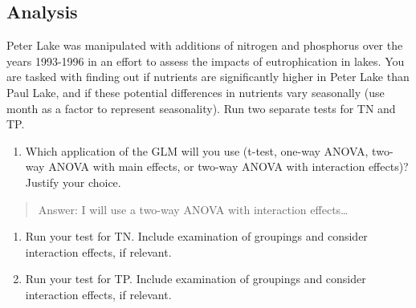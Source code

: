 \documentclass[]{article}
\newenvironment{Shaded}{\begin{snugshade}}{\end{snugshade}}
\newcommand{\CommentTok}[1]{\textcolor[rgb]{0.56,0.35,0.01}{\textit{#1}}}
\newcommand{\DataTypeTok}[1]{\textcolor[rgb]{0.13,0.29,0.53}{#1}}
\newcommand{\FloatTok}[1]{\textcolor[rgb]{0.00,0.00,0.81}{#1}}
\newcommand{\KeywordTok}[1]{\textcolor[rgb]{0.13,0.29,0.53}{\textbf{#1}}}
\newcommand{\NormalTok}[1]{#1}
\newcommand{\OperatorTok}[1]{\textcolor[rgb]{0.81,0.36,0.00}{\textbf{#1}}}
\newcommand{\StringTok}[1]{\textcolor[rgb]{0.31,0.60,0.02}{#1}}
\providecommand{\tightlist}{%
  \setlength{\itemsep}{0pt}\setlength{\parskip}{0pt}}
\begin{document}
\hypertarget{analysis}{%
\subsection{Analysis}\label{analysis}}

Peter Lake was manipulated with additions of nitrogen and phosphorus
over the years 1993-1996 in an effort to assess the impacts of
eutrophication in lakes. You are tasked with finding out if nutrients
are significantly higher in Peter Lake than Paul Lake, and if these
potential differences in nutrients vary seasonally (use month as a
factor to represent seasonality). Run two separate tests for TN and TP.

\begin{enumerate}
\def\labelenumi{\arabic{enumi}.}
\setcounter{enumi}{3}
\tightlist
\item
  Which application of the GLM will you use (t-test, one-way ANOVA,
  two-way ANOVA with main effects, or two-way ANOVA with interaction
  effects)? Justify your choice.
\end{enumerate}

\begin{quote}
Answer: I will use a two-way ANOVA with interaction effects\ldots{}
\end{quote}

\begin{enumerate}
\def\labelenumi{\arabic{enumi}.}
\setcounter{enumi}{4}
\item
  Run your test for TN. Include examination of groupings and consider
  interaction effects, if relevant.
\item
  Run your test for TP. Include examination of groupings and consider
  interaction effects, if relevant.
\end{enumerate}

\begin{Shaded}
\end{Shaded}
\end{document}
